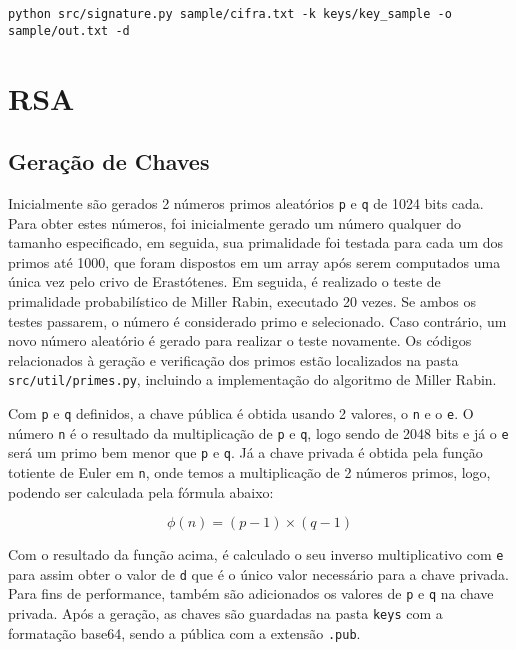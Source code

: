 \documentclass[12pt]{article}
\begin{document}
\begin{lstlisting}
python src/signature.py sample/cifra.txt -k keys/key_sample -o sample/out.txt -d
\end{lstlisting}

\section{RSA}
\subsection{Geração de Chaves}

Inicialmente são gerados 2 números primos aleatórios \texttt{p} e \texttt{q} de 1024 bits cada. Para obter estes números, foi inicialmente gerado um número qualquer do tamanho especificado, em seguida, sua primalidade foi testada para cada um dos primos até 1000, que foram dispostos em um array após serem computados uma única vez pelo crivo de Erastótenes. Em seguida, é realizado o teste de primalidade probabilístico de Miller Rabin, executado 20 vezes. Se ambos os testes passarem, o número é considerado primo e selecionado. Caso contrário, um novo número aleatório é gerado para realizar o teste novamente. Os códigos relacionados à geração e verificação dos primos estão localizados na pasta \texttt{src/util/primes.py}, incluindo a implementação do algoritmo de Miller Rabin.

Com \texttt{p} e \texttt{q} definidos, a chave pública é obtida usando 2 valores, o \texttt{n} e o \texttt{e}. O número \texttt{n} é o resultado da multiplicação de \texttt{p} e \texttt{q}, logo sendo de 2048 bits e já o \texttt{e} será um primo bem menor que \texttt{p} e \texttt{q}. Já a chave privada é obtida pela função totiente de Euler em \texttt{n}, onde temos a multiplicação de 2 números primos, logo, podendo ser calculada pela fórmula abaixo:

\[
    \phi(n) = (p-1) \times (q-1)
\]

Com o resultado da função acima, é calculado o seu inverso multiplicativo com \texttt{e} para assim obter o valor de \texttt{d} que é o único valor necessário para a chave privada. Para fins de performance, também são adicionados os valores de \texttt{p} e \texttt{q} na chave privada. Após a geração, as chaves são guardadas na pasta \texttt{keys} com a formatação base64, sendo a pública com a extensão \texttt{.pub}.

\subsection{}
\end{document}
